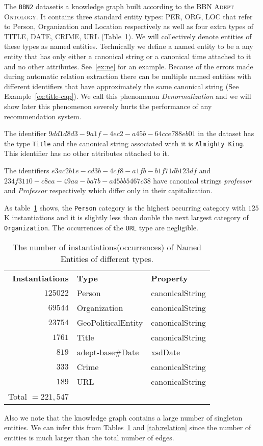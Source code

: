 \documentclass[paper=a4,fontsize=11pt]{scrartcl}
\newcommand{\tabref}[1]{table~\ref{#1}}
\newcommand{\Tabref}[1]{Table~\ref{#1}}
\newcommand{\Exref}[1]{Example~\ref{#1}}
\numberwithin{equation}{section}    %
\numberwithin{figure}{section}      %
\numberwithin{table}{section}       %
\newcommand{\dataset}[0]{\texttt{BBN2} dataset}
\newcommand{\ontology}{\textsc{BBN Adept Ontology}}
\begin{document}
The \dataset is a knowledge graph built according to the \ontology.
It contains three standard entity types: \textsc{PER, ORG, LOC}
that refer to Person, Organization and Location respectively as well
as four extra types of \textsc{TITLE, DATE, CRIME, URL} (\Tabref{tab:type}).
We will collectively denote entities
of these types as named entities. Technically we define a named entity to be a
any entity that has only either a canonical string
or a canonical time attached to it and no other attributes.
See~\ref{ex:ne}  for an example.
Because of the errors made during automatic relation extraction there can be multiple
named entities with different identifiers that have approximately the same canonical string
(See \Exref{ex:title-cap}). We call this phenomenon \textit{Denormalization} and we will show
later this phenomenon severely hurts the performance of any recommendation system.
\begin{example}\label{ex:ne}
  The identifier $9dd1d8d3-9a1f-4ec2-a45b-64cce788eb01$ in the dataset has
the type \texttt{Title}
and the canonical string associated with it is \texttt{Almighty King}. This
identifier has no other attributes attached to it.
\end{example}
\begin{example}\label{ex:title-cap}
  The identifiers $e3ac2b1e-cd3b-4cf8-a1fb-b1f71db123df$ and
  $234f3110-c8ca-49aa-ba7b-a45bb5467c38$ have canonical strings \textit{professor} and
  \textit{Professor} respectively which differ only in their capitalization.
\end{example}
As \tabref{tab:type} shows, the \texttt{Person} category is the highest occurring
category with $125$K instantiations
and it is slightly less than double the next largest category of \texttt{Organization}.
The occurrences of the \texttt{URL} type are negligible.
\begin{table}[htbp]
  \centering
  \begin{tabular}{r l l}
    \textbf{Instantiations} & \textbf{Type}& \textbf{Property}\\
    $125022$         & Person             & canonicalString \\
    $69544$          & Organization       & canonicalString \\
    $23754$          & GeoPoliticalEntity & canonicalString \\
    $1761$           & Title              & canonicalString \\
    $819$            & adept-base#Date    & xsdDate         \\
    $333$            & Crime              & canonicalString \\
    $189$            & URL                & canonicalString \\\cline{1-1}
    Total $= 221,547$   \\
  \end{tabular}
  \caption{The number of instantiations(occurrences) of Named Entities of different types.}
  \label{tab:type}
\end{table}
Also we note that the knowledge graph contains a large number of singleton entities.
We can infer this from Tables~\ref{tab:type} and \ref{tab:relation}
since the number of entities is much larger than the total number of edges.
\end{document}
